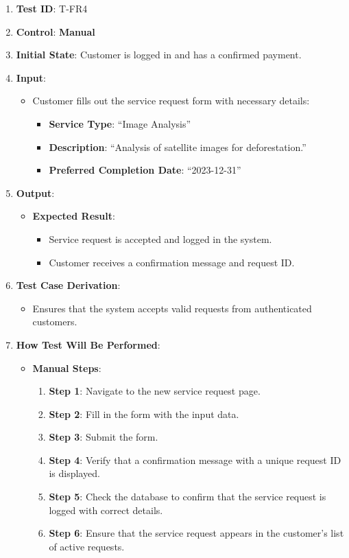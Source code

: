 \documentclass[12pt, titlepage]{article}
\begin{document}
\begin{enumerate}
    \item \textbf{Test ID}: T-FR4
    \item \textbf{Control}: \textbf{Manual}
    \item \textbf{Initial State}: Customer is logged in and has a confirmed payment.
    \item \textbf{Input}:
    \begin{itemize}
        \item Customer fills out the service request form with necessary details:
        \begin{itemize}
            \item \textbf{Service Type}: ``Image Analysis''
            \item \textbf{Description}: ``Analysis of satellite images for deforestation.''
            \item \textbf{Preferred Completion Date}: ``2023-12-31''
        \end{itemize}
    \end{itemize}
    \item \textbf{Output}:
    \begin{itemize}
        \item \textbf{Expected Result}:
        \begin{itemize}
            \item Service request is accepted and logged in the system.
            \item Customer receives a confirmation message and request ID.
        \end{itemize}
    \end{itemize}
    \item \textbf{Test Case Derivation}:
    \begin{itemize}
        \item Ensures that the system accepts valid requests from authenticated customers.
    \end{itemize}
    \item \textbf{How Test Will Be Performed}:
    \begin{itemize}
        \item \textbf{Manual Steps}:
        \begin{enumerate}
            \item \textbf{Step 1}: Navigate to the new service request page.
            \item \textbf{Step 2}: Fill in the form with the input data.
            \item \textbf{Step 3}: Submit the form.
            \item \textbf{Step 4}: Verify that a confirmation message with a unique request ID is displayed.
            \item \textbf{Step 5}: Check the database to confirm that the service request is logged with correct details.
            \item \textbf{Step 6}: Ensure that the service request appears in the customer's list of active requests.
        \end{enumerate}
    \end{itemize}
\end{enumerate}
\end{document}
